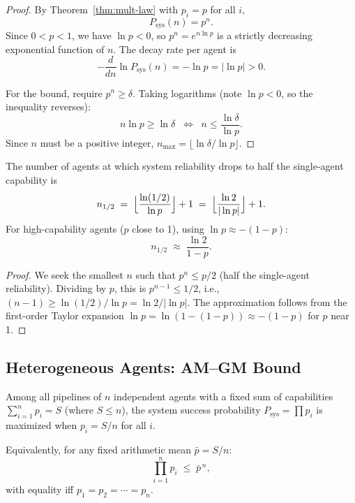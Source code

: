 \begin{proof}
By Theorem~\ref{thm:mult-law} with $p_i = p$ for all $i$,
\[
  P_{\mathrm{sys}}(n) = p^n.
\]
Since $0 < p < 1$, we have $\ln p < 0$, so $p^n = e^{n \ln p}$ is a strictly
decreasing exponential function of $n$. The decay rate per agent is
\[
  -\frac{d}{dn}\ln P_{\mathrm{sys}}(n) = -\ln p = |\ln p| > 0.
\]

For the bound, require $p^n \geq \delta$. Taking logarithms (note $\ln p < 0$, so
the inequality reverses):
\[
  n \ln p \geq \ln \delta
  \;\;\Longleftrightarrow\;\;
  n \leq \frac{\ln \delta}{\ln p}.
\]
Since $n$ must be a positive integer, $n_{\max} = \lfloor \ln\delta / \ln p \rfloor$.
\end{proof}

\begin{corollary}
\label{cor:half-life}
The number of agents at which system reliability drops to half the single-agent
capability is
\[
  n_{1/2} \;=\; \Bigl\lfloor \frac{\ln(1/2)}{\ln p} \Bigr\rfloor + 1
  \;=\; \Bigl\lfloor \frac{\ln 2}{|\ln p|} \Bigr\rfloor + 1.
\]
For high-capability agents ($p$ close to 1), using $\ln p \approx -(1-p)$:
\[
  n_{1/2} \;\approx\; \frac{\ln 2}{1-p}.
\]
\end{corollary}

\begin{proof}
We seek the smallest $n$ such that $p^n \leq p/2$ (half the single-agent reliability).
Dividing by $p$, this is $p^{n-1} \leq 1/2$, i.e., $(n-1) \geq \ln(1/2)/\ln p =
\ln 2 / |\ln p|$. The approximation follows from the first-order Taylor expansion
$\ln p = \ln(1-(1-p)) \approx -(1-p)$ for $p$ near 1.
\end{proof}

\subsection{Heterogeneous Agents: AM--GM Bound}

\begin{lemma}
\label{lem:am-gm}
Among all pipelines of $n$ independent agents with a fixed sum of capabilities
$\sum_{i=1}^{n} p_i = S$ (where $S \leq n$), the system success probability
$P_{\mathrm{sys}} = \prod p_i$ is maximized when $p_i = S/n$ for all $i$.

Equivalently, for any fixed arithmetic mean $\bar{p} = S/n$:
\[
  \prod_{i=1}^{n} p_i \;\leq\; \bar{p}^{\,n},
\]
with equality iff $p_1 = p_2 = \cdots = p_n$.
\end{lemma}

